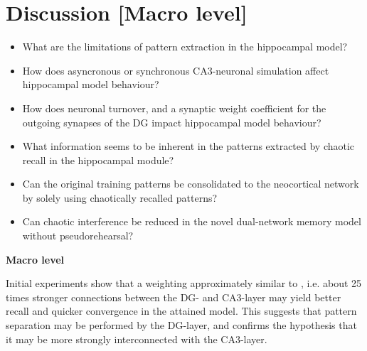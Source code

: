 
\chapter{Discussion [Macro level]}\label{chpt:discussion}



\begin{itemize}
    \item What are the limitations of pattern extraction in the hippocampal model?
    \item How does asyncronous or synchronous CA3-neuronal simulation affect hippocampal model behaviour?
    \item How does neuronal turnover, and a synaptic weight coefficient for the outgoing synapses of the DG impact hippocampal model behaviour?
    \item What information seems to be inherent in the patterns extracted by chaotic recall in the hippocampal module?
    \item Can the original training patterns be consolidated to the neocortical network by solely using chaotically recalled patterns?
    \item Can chaotic interference be reduced in the novel dual-network memory model without pseudorehearsal?
\end{itemize}




\newpage
\textbf{Macro level}

Initial experiments show that a weighting approximately similar to \citep{Wakagi2008}, i.e. about 25 times stronger connections between the DG- and CA3-layer may yield better recall and quicker convergence in the attained model. This suggests that pattern separation may be performed by the DG-layer, and confirms the hypothesis that it may be more strongly interconnected with the CA3-layer.

